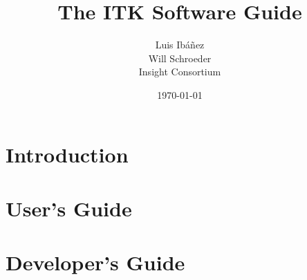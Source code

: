 \documentclass{InsightManual}
\title{The ITK Software Guide}
\author{Luis Ib\'{a}\~{n}ez\\Will Schroeder\\Insight Consortium}
\date{\today}
\begin{document}
\maketitle

%


\tableofcontents





\part{Introduction}
%

%


\part{User's Guide}
%
%

%
%

%



\part{Developer's Guide}
%
%
%
%
%
%








\end{document}
